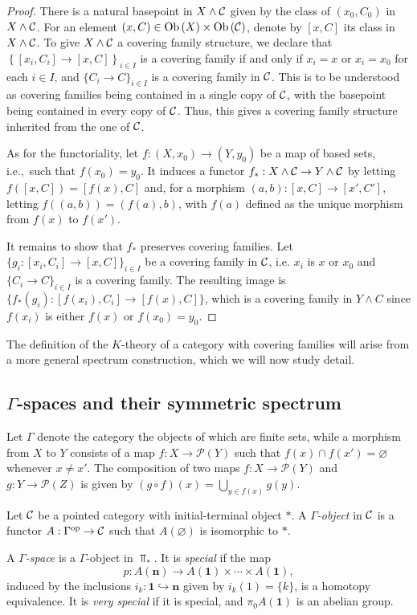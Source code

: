 \begin{proof}
    There is a natural basepoint in $X \wedge \mathcal{C}$ given by the class of $(x_0, C_0)$ in $X \wedge \mathcal{C}$. For an element $(x, C) \in \operatorname{Ob}{\lparen X \rparen} \times \operatorname{Ob}{\lparen \mathcal{C} \rparen}$, denote by $[x, C]$ its class in $X \wedge \mathcal{C}$. To give $X \wedge \mathcal{C}$ a covering family structure, we declare that $\left\{[x_i, C_i] \to [x, C]\right\}_{i \in I}$ is a covering family if and only if $x_i = x$ or $x_i = x_0$ for each $i \in I$, and $\{C_i \to C\}_{i \in I}$ is a covering family in $\mathcal{C}$. This is to be understood as covering families being contained in a single copy of $\mathcal{C}$, with the basepoint being contained in every copy of $\mathcal{C}$. Thus, this gives a covering family structure inherited from the one of $\mathcal{C}$.

    As for the functoriality, let $f : (X, x_0) \to (Y, y_0)$ be a map of based sets, i.e.,~such that $f(x_0) = y_0$. It induces a functor $f_* : X \wedge \mathcal{C} \to Y \wedge \mathcal{C}$ by letting $f([x, C]) = [f(x), C]$ and, for a morphism $(a, b): [x, C] \to [x', C']$, letting $f((a,b)) = (f(a), b)$, with $f(a)$ defined as the unique morphism from $f(x)$ to $f(x')$.

    It remains to show that $f_*$ preserves covering families. Let $\{g_i : [x_i,C_i] \to [x,C]\}_{i \in I}$ be a covering family in $\mathcal{C}$, i.e. $x_i$ is $x$ or $x_0$ and $\{C_i \to C\}_{i \in I}$ is a covering family. The resulting image is $\{f_*(g_i) : [f(x_i), C_i] \to [f(x), C]\}$, which is a covering family in $Y \wedge C$ since $f(x_i)$ is either $f(x)$ or $f(x_0) = y_0$.
\end{proof}

The definition of the $K$-theory of a category with covering families will arise from a more general spectrum construction, which we will now study detail. 

\subsection[Gamma-spaces and their symmetric spectrum]{$\Gamma$-spaces and their symmetric spectrum}

\begin{definition}
    Let $\Gamma$ denote the category the objects of which are finite sets, while a morphism from $X$ to $Y$ consists of a map $f : X \to \mathcal{P}(Y)$ such that $f(x) \cap f(x') = \varnothing$ whenever $x \neq x'$. The composition of two maps $f: X \to \mathcal{P}(Y)$ and $g: Y \to \mathcal{P}(Z)$ is given by ${(g \circ f) (x) = \bigcup_{y \in f(x)} g(y)}$.

    Let ${\mathcal{C}}$ be a pointed category with initial-terminal object $*$.
    A \emph{$\Gamma$-object} in $\mathcal{C}$ is a functor $A : \Gamma^{\textnormal{op}} \to \mathcal{C}$ such that $A(\varnothing)$ is isomorphic to $*$.
    
    A \emph{$\Gamma$-space} is a $\Gamma$-object in $\Top_*$. It is \emph{special} if the map
    \[ p : A(\textbf{n}) \to A(\textbf{1}) \times \cdots \times A(\textbf{1}),\]
    induced by the inclusions $i_k: \textbf{1} \hookrightarrow \textbf{n}$ given by $i_k(1) = \{k\}$, is a homotopy equivalence. It is \emph{very special} if it is special, and $\pi_0 A(\textbf{1})$ is an abelian group.
\end{definition} 

